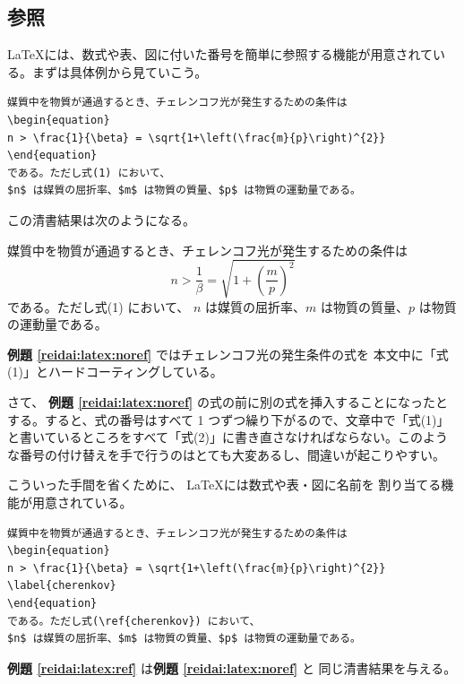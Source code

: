 \subsection{参照}
\label{sec:latex:reference}

\LaTeX には、数式や表、図に付いた番号を簡単に参照する機能が用意されている。まずは具体例から見ていこう。
\begin{reidai}
\label{reidai:latex:noref}
\begin{verbatim}
媒質中を物質が通過するとき、チェレンコフ光が発生するための条件は
\begin{equation}
n > \frac{1}{\beta} = \sqrt{1+\left(\frac{m}{p}\right)^{2}}
\end{equation}
である。ただし式(1) において、
$n$ は媒質の屈折率、$m$ は物質の質量、$p$ は物質の運動量である。
\end{verbatim}
\end{reidai} \noindent
この清書結果は次のようになる。
\begin{kekka}
  媒質中を物質が通過するとき、チェレンコフ光が発生するための条件は
  \begin{equation}
    n > \frac{1}{\beta} = \sqrt{1+\left(\frac{m}{p}\right)^{2}}
  \end{equation}
  である。ただし式(1) において、
  $n$ は媒質の屈折率、$m$ は物質の質量、$p$ は物質の運動量である。\\
\end{kekka} \noindent
\textbf{例題 \ref{reidai:latex:noref}} ではチェレンコフ光の発生条件の式を
本文中に「式(1)」とハードコーティングしている。

さて、 \textbf{例題 \ref{reidai:latex:noref}} の式の前に別の式を挿入することになったとする。すると、式の番号はすべて 1 つずつ繰り下がるので、文章中で「式(1)」と書いているところをすべて「式(2)」に書き直さなければならない。このような番号の付け替えを手で行うのはとても大変あるし、間違いが起こりやすい。

こういった手間を省くために、 \LaTeX には数式や表・図に名前を
割り当てる機能が用意されている。
\begin{reidai}
\label{reidai:latex:ref}
\begin{verbatim}
媒質中を物質が通過するとき、チェレンコフ光が発生するための条件は
\begin{equation}
n > \frac{1}{\beta} = \sqrt{1+\left(\frac{m}{p}\right)^{2}} \label{cherenkov}
\end{equation}
である。ただし式(\ref{cherenkov}) において、
$n$ は媒質の屈折率、$m$ は物質の質量、$p$ は物質の運動量である。
\end{verbatim}
\end{reidai} \noindent
\textbf{例題 \ref{reidai:latex:ref}} は\textbf{例題 \ref{reidai:latex:noref}} と
同じ清書結果を与える。

